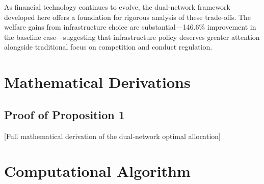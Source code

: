 \documentclass[12pt]{article}
\begin{document}
As financial technology continues to evolve, the dual-network framework developed here offers a foundation for rigorous analysis of these trade-offs. The welfare gains from infrastructure choice are substantial---146.6\% improvement in the baseline case---suggesting that infrastructure policy deserves greater attention alongside traditional focus on competition and conduct regulation.


\newpage


\newpage
\appendix

\section{Mathematical Derivations}
\label{app:derivation}

\subsection{Proof of Proposition 1}

[Full mathematical derivation of the dual-network optimal allocation]

\section{Computational Algorithm}
\end{document}
